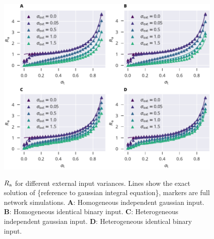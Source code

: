 \documentclass[12pt]{article}
\begin{document}
  \begin{figure}
    \includegraphics[width=5.78in]{./r_a_sweep_composite.pdf}
    \label{fig:alt_hom_regulation}
    \caption{ $R_{\rm a}$ for different external input variances. Lines show the exact solution of \{reference to gaussian integral equation\}, markers are full network simulations.
    {\bf A}: Homogeneous independent gaussian input.
     {\bf B}: Homogeneous identical binary input. 
     {\bf C}: Heterogeneous independent gaussian input. 
     {\bf D}: Heterogeneous identical binary input.}
  \end{figure}
\end{document}
